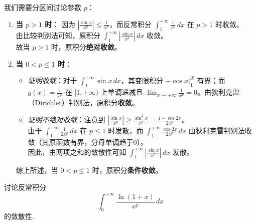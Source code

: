 \documentclass[lang=cn,12pt]{elegantbook}
\begin{document}
\begin{solution}
    我们需要分区间讨论参数 $p$：
    \begin{enumerate}
        \item {\bfseries 当 $p > 1$ 时}：
        因为 $\left| \frac{\sin x}{x^p} \right| \le \frac{1}{x^p}$，而反常积分 $\int_1^{+\infty} \frac{1}{x^p} \, dx$ 在 $p>1$ 时收敛。 \\
        由比较判别法可知，原积分 $\int_1^{+\infty} \left| \frac{\sin x}{x^p} \right| \, dx$ 收敛。\\
        故当 $p > 1$ 时，原积分{\bfseries 绝对收敛}。
        
        \item {\bfseries 当 $0 < p \le 1$ 时}：
        \begin{itemize}
            \item[1)] {\itshape 证明收敛}：对于 $\int_1^{+\infty} \sin x \, dx$，其变限积分 $-\cos x \Big|_1^X$ 有界；而 $g(x) = \frac{1}{x^p}$ 在 $[1, +\infty)$ 上单调递减且 $\lim_{x \to +\infty} \frac{1}{x^p} = 0$。由狄利克雷（Dirichlet）判别法，原积分{\bfseries 收敛}。
            \item[2)] {\itshape 证明不绝对收敛}：注意到 $\left| \frac{\sin x}{x^p} \right| \ge \frac{\sin^2 x}{x^p} = \frac{1 - \cos 2x}{2x^p}$。 \\
            由于 $\int_1^{+\infty} \frac{1}{2x^p} \, dx$ 在 $p \le 1$ 时发散，而 $\int_1^{+\infty} \frac{\cos 2x}{2x^p} \, dx$ 由狄利克雷判别法收敛（其原函数有界，分母单调趋于0）。\\
            因此，由两项之和的敛散性可知 $\int_1^{+\infty} \left| \frac{\sin x}{x^p} \right| \, dx$ 发散。
        \end{itemize}
        综上所述，当 $0 < p \le 1$ 时，原积分{\bfseries 条件收敛}。
    \end{enumerate}
\end{solution}

\vspace{1em}

\begin{example}
    讨论反常积分 $$\displaystyle \int_{0}^{+\infty} \frac{\ln(1+x)}{x^p} \, dx  $$ 的敛散性.
\end{example}
\end{document}
